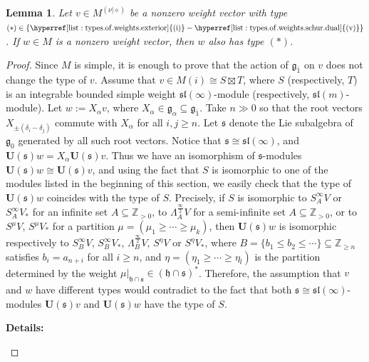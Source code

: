 \documentclass[12pt]{amsart}
\newcommand\Z{\mathbb{Z}}
\newcommand\g{\mathfrak{g}}
\newcommand\fs{\mathfrak{s}}
\newcommand\fh{\mathfrak{h}}
\newcommand\fsl{\mathfrak{sl}}
\newcommand\bU{\mathbf{U}}
\theoremstyle{plain}
\newtheorem{lem}[theo]{Lemma}
\theoremstyle{definition}
\numberwithin{equation}{section}
\newcommand{\details}[1]{\smallskip \color{blue} \begin{footnotesize} \textbf{Details:} #1 \end{footnotesize} \color{black}}
\newcommand{\details}[1]{}
\begin{document}
\begin{lem}\label{lem:components.same.type}
Let $v\in M^{(\nu|\diamond)}$ be a nonzero weight vector with type  $(*) \in \{\rm \hyperref[list:types.of.weights.exterior]{(i)} \rm - \hyperref[list:types.of.weights.schur.dual]{(v)}\}$. If $w\in M$ is a nonzero weight vector, then $w$ also has type $(*)$.
\end{lem}
\begin{proof}
Since $M$ is simple, it is enough to prove that the action of $\g_{\bar 1}$ on $v$ does not change the type of $v$. Assume that $v\in M(i)\cong S\boxtimes T$, where $S$ (respectively, $T$) is an integrable bounded simple weight $\fsl(\infty)$-module (respectively, $\fsl(m)$-module). Let $w := X_{\alpha}v$, where $X_{\alpha} \in \g_\alpha\subseteq \g_{\bar 1}$. Take $n\gg 0$ so that the root vectors $X_{\pm (\delta_i - \delta_j)}$ commute with $X_\alpha$ for all $i,j\geq n$. Let $\fs$ denote the Lie subalgebra of $\g_0$ generated by all such root vectors. Notice that $\fs \cong \fsl(\infty)$, and $\bU(\fs)w = X_\alpha \bU(\fs)v$. Thus we have an isomorphism of $\fs$-modules $\bU(\fs)w\cong \bU(\fs)v$, and using the fact that $S$ is isomorphic to one of the modules listed in the beginning of this section, we easily check that the type of $\bU(\fs)w$ coincides with the type of $S$. Precisely, if $S$ is isomorphic to $S_A^\infty V$ or $S_A^\infty V_*$ for an infinite set $A\subseteq \Z_{>0}$, to $ \Lambda_A^{\frac{\infty}{2}} V$ for a semi-infinite set $A\subseteq \Z_{>0}$, or to $S^\mu V$, $S^\mu V_*$ for a partition $\mu = (\mu_1\geq \cdots \geq \mu_k)$, then $\bU(\fs)w$ is isomorphic respectively to $S_B^\infty V$, $S_B^\infty V_*$, $\Lambda_B^{\frac{\infty}{2}} V$, $S^\eta V$ or $S^\eta V_*$, where $B = \{b_1\leq b_2\leq \cdots\}\subseteq \Z_{\geq n}$ satisfies $b_i = a_{n+i}$ for all $i\geq n$, and $\eta = (\eta_1\geq \cdots \geq \eta_l)$ is the partition determined by the weight $\mu|_{\fh\cap \fs}\in (\fh\cap \fs)^*$. Therefore, the assumption that $v$ and $w$ have different types would contradict to the fact that both $\fs \cong \fsl(\infty)$-modules $\bU(\fs)v$ and $\bU(\fs)w$ have the type of $S$.
\details{ 
}
\end{proof}
\end{document}
